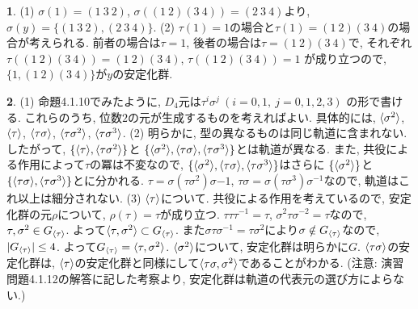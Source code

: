 \documentclass{amsart}
\theoremstyle{definition}
\newtheorem{ans}{}
\numberwithin{ans}{subsection}
\DeclarePairedDelimiter{\gen}{\langle}{\rangle}
\DeclarePairedDelimiter{\abs}{\lvert}{\rvert}
\begin{document}
\begin{ans}
  (1) $\sigma(1) = (1\ 3\ 2)$, $\sigma((1\ 2)(3\ 4)) = (2\ 3\ 4)$より,
  $\sigma(y) = \{(1\ 3\ 2), (2\ 3\ 4)\}$.
  (2) $\tau(1) = 1$の場合と$\tau(1) = (1\ 2)(3\ 4)$の場合が考えられる.
  前者の場合は$\tau = 1$, 後者の場合は$\tau = (1\ 2)(3\ 4)$で,
  それぞれ$\tau((1\ 2)(3\ 4)) = (1\ 2)(3\ 4)$, $\tau((1\ 2)(3\ 4)) = 1$
  が成り立つので, $\{1, (1\ 2)(3\ 4)\}$が$y$の安定化群.
\end{ans}

\begin{ans}
  (1) 命題4.1.10でみたように, $D_4$元は$\tau^i\sigma^j\ (i = 0, 1,\ j = 0, 1, 2, 3)$
  の形で書ける. これらのうち, 位数$2$の元が生成するものを考えればよい.
  具体的には, $\gen{\sigma^2}$, $\gen{\tau}$, $\gen{\tau\sigma}$, $\gen{\tau\sigma^2}$, $\gen{\tau\sigma^3}$.
  (2) 明らかに, 型の異なるものは同じ軌道に含まれない.
  したがって, $\{\gen{\tau}, \gen{\tau\sigma^2}\}$と
  $\{\gen{\sigma^2}, \gen{\tau\sigma}, \gen{\tau\sigma^3}\}$とは軌道が異なる.
  また, 共役による作用によって$\tau$の冪は不変なので,
  $\{\gen{\sigma^2}, \gen{\tau\sigma}, \gen{\tau\sigma^3}\}$はさらに
  $\{\gen{\sigma^2}\}$と$\{\gen{\tau\sigma}, \gen{\tau\sigma^3}\}$とに分かれる.
  $\tau = \sigma(\tau\sigma^2)\sigma{-1}$, $\tau\sigma = \sigma(\tau\sigma^3)\sigma^{-1}$なので,
  軌道はこれ以上は細分されない.
  (3) $\gen{\tau}$について.
  共役による作用を考えているので, 安定化群の元$\rho$について, $\rho(\tau) = \tau$が成り立つ.
  $\tau\tau\tau^{-1} = \tau$, $\sigma^2\tau\sigma^{-2} = \tau$なので,
  $\tau, \sigma^2 \in G_{\gen{\tau}}$. よって$\gen{\tau, \sigma^{2}} \subset G_{\gen{\tau}}$.
  また$\sigma\tau\sigma^{-1} = \tau\sigma^2$により$\sigma \notin G_{\gen{\tau}}$なので,
  $\abs{G_{\gen{\tau}}} \le 4$. よって$G_{\gen{\tau}} = \gen{\tau, \sigma^2}$.
  $\gen{\sigma^2}$について, 安定化群は明らかに$G$.
  $\gen{\tau\sigma}$の安定化群は, $\gen{\tau}$の安定化群と同様にして$\gen{\tau\sigma, \sigma^2}$であることがわかる.
  (注意: 演習問題4.1.12の解答に記した考察より, 安定化群は軌道の代表元の選び方によらない.)
\end{ans}
\end{document}

